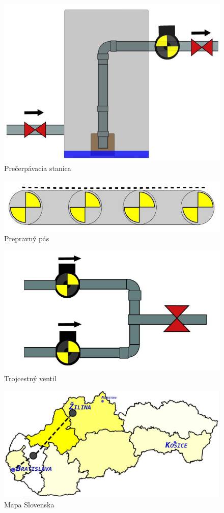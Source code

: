 \begin{figure}[H]
	\centering
	\includegraphics[width=0.7\linewidth]{obrazky/pump}
	\caption{Prečerpávacia stanica}
	\label{fig:pump}
\end{figure}
\begin{figure}[H]
	\centering
	\includegraphics[width=0.7\linewidth]{obrazky/belt}
	\caption{Prepravný pás}
	\label{fig:belt}
\end{figure}
\begin{figure}[H]
	\centering
	\includegraphics[width=0.7\linewidth]{obrazky/trippleValve}
	\caption{Trojcestný ventil}
	\label{fig:trippleValve}
\end{figure}
\begin{figure}[H]
	\centering
	\includegraphics[width=0.7\linewidth]{obrazky/map}
	\caption{Mapa Slovenska}
	\label{fig:map}
\end{figure}
